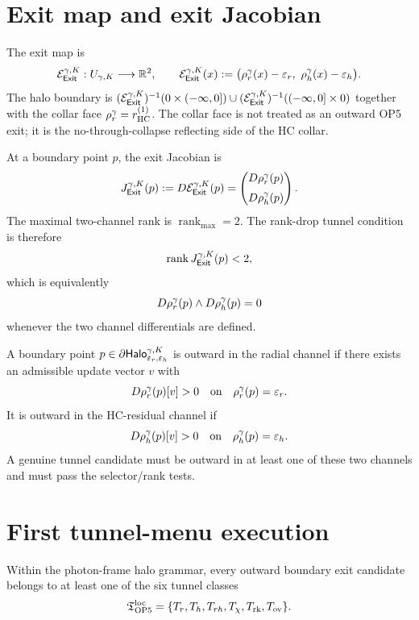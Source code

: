 \section{Exit map and exit Jacobian}

\begin{definition}
The exit map is
\[
\mathcal E_{\mathsf{Exit}}^{\gamma,K}:U_{\gamma,K}\longrightarrow \mathbb R^2,
\qquad
\mathcal E_{\mathsf{Exit}}^{\gamma,K}(x):=\bigl(\rho_{r}^{\gamma}(x)-\varepsilon_r,\ \rho_{h}^{\gamma}(x)-\varepsilon_h\bigr).
\]
The halo boundary is \((\mathcal E_{\mathsf{Exit}}^{\gamma,K})^{-1}(0\times(-\infty,0])\cup(\mathcal E_{\mathsf{Exit}}^{\gamma,K})^{-1}((-
\infty,0]\times0)\) together with the collar face \(\rho_{r}^{\gamma}=r_{\mathrm{HC}}^{(1)}\). The collar face is not treated as an outward OP5 exit; it is the no-through-collapse reflecting side of the HC collar.
\end{definition}

\begin{definition}
At a boundary point \(p\), the exit Jacobian is
\[
J_{\mathsf{Exit}}^{\gamma,K}(p)
:=
D\mathcal E_{\mathsf{Exit}}^{\gamma,K}(p)
=
\begin{pmatrix}
D\rho_{r}^{\gamma}(p)\\[2mm]
D\rho_{h}^{\gamma}(p)
\end{pmatrix}.
\]
The maximal two-channel rank is \(\operatorname{rank}_{\max}=2\). The rank-drop tunnel condition is therefore
\[
\operatorname{rank}J_{\mathsf{Exit}}^{\gamma,K}(p)<2,
\]
which is equivalently
\[
D\rho_{r}^{\gamma}(p)\wedge D\rho_{h}^{\gamma}(p)=0
\]
whenever the two channel differentials are defined.
\end{definition}

\begin{definition}
A boundary point \(p\in\partial\mathsf{Halo}_{\varepsilon_r,\varepsilon_h}^{\gamma,K}\) is outward in the radial channel if there exists an admissible update vector \(v\) with
\[
D\rho_{r}^{\gamma}(p)[v]>0
\quad\text{on}\quad \rho_{r}^{\gamma}(p)=\varepsilon_r.
\]
It is outward in the HC-residual channel if
\[
D\rho_{h}^{\gamma}(p)[v]>0
\quad\text{on}\quad \rho_{h}^{\gamma}(p)=\varepsilon_h.
\]
A genuine tunnel candidate must be outward in at least one of these two channels and must pass the selector/rank tests.
\end{definition}

\section{First tunnel-menu execution}

\begin{proposition}
Within the photon-frame halo grammar, every outward boundary exit candidate belongs to at least one of the six tunnel classes
\[
\mathfrak T_{\mathrm{OP}5}^{\mathrm{loc}}
=
\{T_r,T_h,T_{rh},T_{\chi},T_{\mathrm{rk}},T_{\mathrm{ov}}\}.
\]
\end{proposition}

